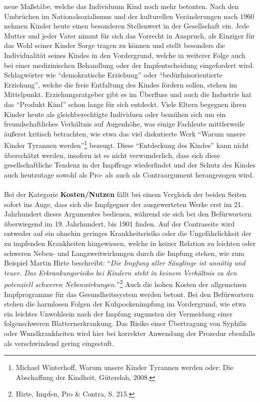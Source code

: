 \documentclass[
    a4paper,
    12pt,
    hyphens,
    chapterprefix=true,
    headheight=33pt,
    footheight=29pt,
    headings=optiontohead, %
]{scrartcl}
\begin{document}
{ neue Maßstäbe, welche das Individuum Kind noch mehr betonten. Nach den Umbrüchen im Nationalsozialismus und der kulturellen Veränderungen nach 1960 nehmen Kinder heute einen besonderen Stellenwert in der Gesellschaft ein. Jede Mutter und jeder Vater nimmt für sich das Vorrecht in Anspruch, als Einziger für das Wohl seiner Kinder Sorge tragen zu können und stellt besonders die Individualität seines Kindes in den Vordergrund, welche in weiterer Folge auch bei einer medizinischen Behandlung oder der Impfentscheidung eingefordert wird. Schlagwörter wie "`demokratische Erziehung"' oder "`bedürfnisorientierte Erziehung"', welche die freie Entfaltung des Kindes fördern sollen, stehen im Mittelpunkt. Erziehungsratgeber gibt es im Überfluss und auch die Industrie hat das "`Produkt Kind"' schon lange für sich entdeckt. Viele Eltern begegnen ihren Kinder heute als gleichberechtigte Individuen oder bemühen sich um ein freundschaftliches Verhältnis auf Augenhöhe, was einige Fachleute mittlerweile äußerst kritisch betrachten, wie etwa das viel diskutierte Werk "`Warum unsere Kinder Tyrannen werden"'\footnote{Michael Winterhoff, Warum unsere Kinder Tyrannen werden oder: Die Abschaffung der Kindheit, Gütersloh, 2008.} bezeugt. Diese "`Entdeckung des Kindes"' kann nicht überschätzt werden, insofern ist es nicht verwunderlich, dass sich diese gesellschaftliche Tendenz in der Impffrage wiederfindet und der Schutz des Kindes auch heutzutage sowohl als Pro- als auch als Contraargument herangezogen wird.\\
\\
Bei der Kategorie \textbf{Kosten/Nutzen} fällt bei einem Vergleich der beiden Seiten sofort ins Auge, dass sich die Impfgegner der ausgewerteten Werke erst im 21. Jahrhundert dieses Argumentes bedienen, während sie sich bei den Befürwortern überwiegend im 19. Jahrhundert, bis 1901 finden. Auf der Contraseite wird entweder auf ein ohnehin geringes Krankheitsrisiko oder die Ungefährlichkeit der zu impfenden Krankheiten hingewiesen, welche in keiner Relation zu leichten oder schweren Neben- und Langzweitwirkungen durch die Impfung stehen, wie zum Beispiel Martin Hirte beschreibt: "`\textit{Die Impfung aller Säuglinge ist unnötig und teuer. Das Erkrankungsrisiko bei Kindern steht in keinem Verhältnis zu den potenziell schweren Nebenwirkungen.}"'\footnote{Hirte, Impfen, Pro \& Contra, S. 215.}
 Auch die hohen Kosten der allgemeinen Impfprogramme für das Gesundheitssystem werden betont. Bei den Befürwortern stehen die harmlosen Folgen der Kuhpockenimpfung im Vordergrund, wie etwa ein leichtes Unwohlsein nach der Impfung zugunsten der Vermeidung einer folgenschweren Blatternerkrankung. Das Risiko einer Übertragung von Syphilis oder Wundkrankheiten wird hier bei korrekter Anwendung der Prozedur ebenfalls als verschwindend gering eingestuft.
}
\end{document}
